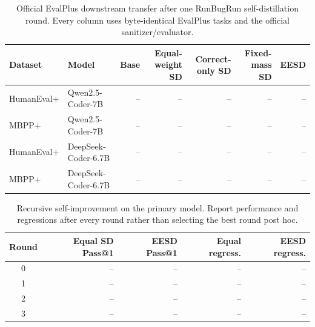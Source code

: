 \begin{table}[t]
\centering
\caption{Official EvalPlus downstream transfer after one RunBugRun self-distillation round.
Every column uses byte-identical EvalPlus tasks and the official sanitizer/evaluator.}
\label{tab:eesd-evalplus-transfer}
\small
\begin{tabular}{llrrrrr}
\toprule
Dataset & Model & Base & Equal-weight SD & Correct-only SD & Fixed-mass SD & EESD \\
\midrule
HumanEval+ & Qwen2.5-Coder-7B & -- & -- & -- & -- & -- \\
MBPP+ & Qwen2.5-Coder-7B & -- & -- & -- & -- & -- \\
HumanEval+ & DeepSeek-Coder-6.7B & -- & -- & -- & -- & -- \\
MBPP+ & DeepSeek-Coder-6.7B & -- & -- & -- & -- & -- \\
\bottomrule
\end{tabular}
\end{table}

\begin{table}[t]
\centering
\caption{Recursive self-improvement on the primary model. Report performance and
regressions after every round rather than selecting the best round post hoc.}
\label{tab:eesd-recursive}
\small
\begin{tabular}{crrrr}
\toprule
Round & Equal SD Pass@1 & EESD Pass@1 & Equal regress. & EESD regress. \\
\midrule
0 & -- & -- & -- & -- \\
1 & -- & -- & -- & -- \\
2 & -- & -- & -- & -- \\
3 & -- & -- & -- & -- \\
\bottomrule
\end{tabular}
\end{table}
